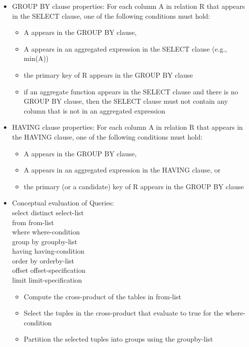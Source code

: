 \documentclass[10pt,landscape,a4paper]{scrartcl}
\begin{document}
\begin{multicols*}{4}
\begin{itemize}
      \item GROUP BY clause properties:
      For each column A in relation R that appears in the SELECT clause, one of the following conditions must hold:
      \begin{itemize}
          \item A appears in the GROUP BY clause,
          \item A appears in an aggregated expression in the SELECT clause (e.g., min(A))
          \item the primary key of R appears in the GROUP BY clause
          \item if an aggregate function appears in the SELECT clause and there is no GROUP BY clause, then the SELECT clause must not contain any column that is not in an aggregated expression
      \end{itemize}
      \item HAVING clause properties:
      For each column A in relation R that appears in the HAVING clause, one of the following conditions must hold:
      \begin{itemize}
          \item A appears in the GROUP BY clause,
          \item A appears in an aggregated expression in the HAVING
          clause, or
          \item the primary (or a candidate) key of R appears in the
          GROUP BY clause
      \end{itemize}
      \item Conceptual evaluation of Queries: \\
      select distinct select-list \\
      from from-list \\
      where where-condition \\
      group by groupby-list \\
      having having-condition \\
      order by orderby-list \\
      offset offset-specification \\
      limit limit-specification
      \begin{itemize}
         \item Compute the cross-product of the tables in from-list
         \item Select the tuples in the cross-product that evaluate to true for the where-condition
        \item Partition the selected tuples into groups using the groupby-list

\end{itemize}
\end{itemize}
\end{multicols*}
\end{document}
